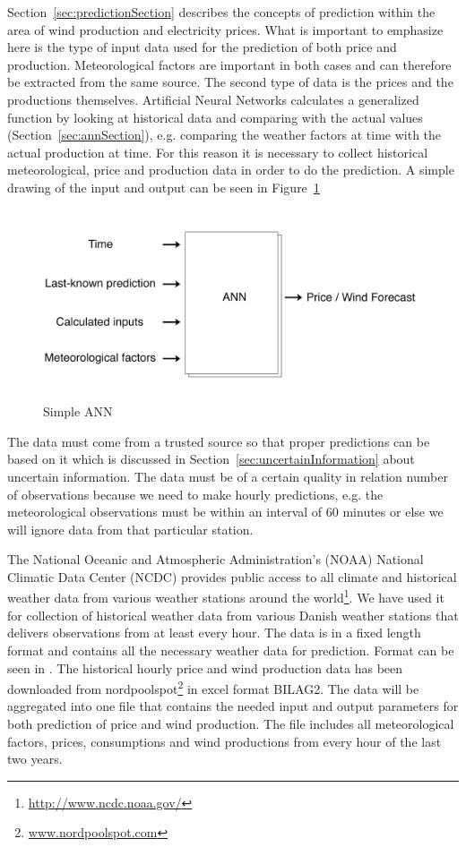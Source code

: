 Section~\ref{sec:predictionSection} describes the concepts of prediction within the area of wind production and electricity prices. What is important to emphasize here is the type of input data used for the prediction of both price and production. Meteorological factors are important in both cases and can therefore be extracted from the same source. The second type of data is the prices and the productions themselves. Artificial Neural Networks calculates a generalized function by looking at historical data and comparing with the actual values (Section~\ref{sec:annSection}), e.g. comparing the weather factors at time with the actual production at time. For this reason it is necessary to collect historical meteorological, price and production data in order to do the prediction. A simple drawing of the input and output can be seen in Figure~\ref{fig:verySimpleANN}

\begin{figure}[H]
\centering
\includegraphics[width=0.85\linewidth]{billeder/simpleANN.png}
\caption{Simple ANN}
\label{fig:verySimpleANN}
\end{figure}

The data must come from a trusted source so that proper predictions can be based on it which is discussed in Section~\ref{sec:uncertainInformation} about uncertain information. The data must be of a certain quality in relation number of observations because we need to make hourly predictions, e.g. the meteorological observations must be within an interval of 60 minutes or else we will ignore data from that particular station.

The National Oceanic and Atmospheric Administration's (NOAA) National Climatic Data Center (NCDC) provides public access to all climate and historical weather data from various weather stations around the world\footnote{\url{http://www.ncdc.noaa.gov/}}. We have used it for collection of historical weather data from various Danish weather stations that delivers observations from at least every hour. The data is in a fixed length format and contains all the necessary weather data for prediction. Format can be seen in . 
The historical hourly price and wind production data has been downloaded from nordpoolspot\footnote{\url{www.nordpoolspot.com}} in excel format BILAG2.
The data will be aggregated into one file that contains the needed input and output parameters for both prediction of price and wind production. The file includes all meteorological factors, prices, consumptions and wind productions from every hour of the last two years. 


